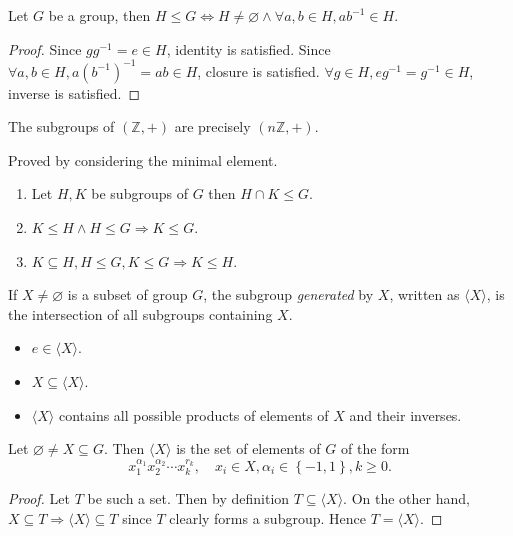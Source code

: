 \documentclass[a4paper]{article}
\begin{document}
    \begin{lemma}\label{lma:subgroup test}
        Let $ G $ be a group, then $ H\le G \Leftrightarrow H\neq \varnothing \land \forall a,b\in H, ab^{-1}\in H $.
    \end{lemma}
    \begin{proof}
        Since $gg^{-1}=e\in H$, identity is satisfied. Since $ \forall a,b\in H, a(b^{-1})^{-1}=ab\in H $, closure is satisfied. $ \forall g\in H, eg^{-1}=g^{-1}\in H $, inverse is satisfied.
    \end{proof}
    \begin{proposition}\label{prop:subgroups of integers}
        The subgroups of $ (\mathbb{Z} ,+) $ are precisely $ (n \mathbb{Z} ,+) $.
    \end{proposition}
    Proved by considering the minimal element.
    \begin{proposition}\label{prop:comparing_groups}
        \begin{enumerate}[(1)]
            \item Let $ H,K $ be subgroups of $G$ then $ H\cap K\le G $.
            \item $ K\le H \land H\le G \Rightarrow K\le G $.
            \item $ K \subseteq H, H\le G, K\le G \Rightarrow K\le H $.
        \end{enumerate}
    \end{proposition}
    \begin{definition}
        If $ X\neq \varnothing $ is a subset of group $G$, the subgroup \textit{generated} by $X$, written as $ \langle X \rangle $, is the intersection of all subgroups containing $X$.
    \end{definition}
    \begin{remark}
        \begin{itemize}
            \item $ e\in \langle X \rangle $.
            \item $ X \subseteq \langle X \rangle $.
            \item $ \langle X \rangle $ contains all possible products of elements of $X$ and their inverses.
        \end{itemize}
    \end{remark}
    \begin{proposition}\label{prop:generation_of_groups}
        Let $ \varnothing \neq X \subseteq G $. Then $ \langle X \rangle $ is the set of elements of $ G $ of the form
        \[
            x_1^{\alpha_1}x_2^{\alpha_2}\cdots x_k^{r_k},\quad x_i\in X, \alpha_i\in \left\{ -1,1\right\}, k\ge 0
        .\]
    \end{proposition}
    \begin{proof}
        Let $T$ be such a set. Then by definition $ T \subseteq \langle X \rangle $. On the other hand, $ X \subseteq T \Rightarrow \langle X \rangle  \subseteq T$ since $T$ clearly forms a subgroup. Hence $ T=\langle X \rangle $.
    \end{proof}
\end{document}
